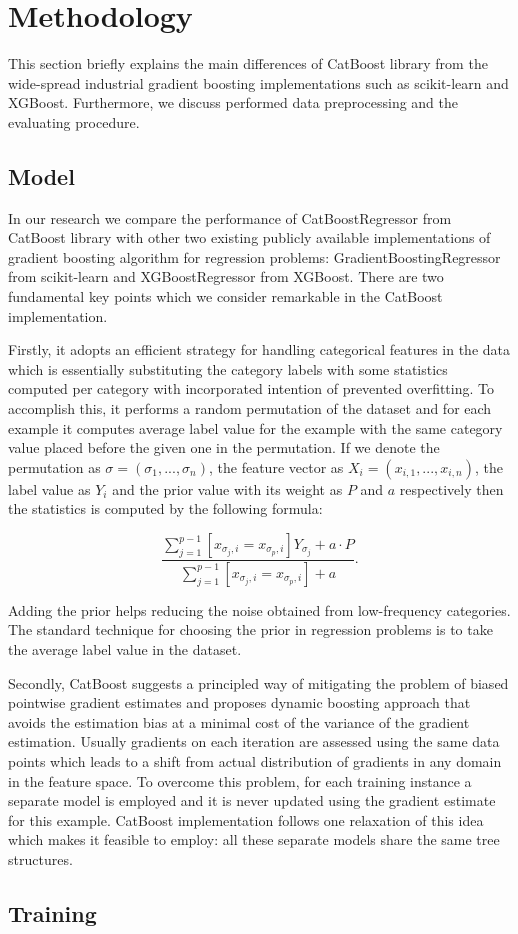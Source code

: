 \section{Methodology}
\label{sec:methodology}

This section briefly explains the main differences of CatBoost library from the wide-spread industrial gradient boosting implementations such as scikit-learn and XGBoost. Furthermore, we discuss performed data preprocessing and the evaluating procedure.

\subsection{Model}

In our research we compare the performance of CatBoostRegressor from CatBoost library with other two existing publicly available implementations of gradient boosting algorithm for regression problems: GradientBoostingRegressor from scikit-learn and XGBoostRegressor from XGBoost. There are two fundamental key points which we consider remarkable in the CatBoost implementation.

Firstly, it adopts an efficient strategy for handling categorical features in the data which is essentially substituting the category labels with some statistics computed per category with incorporated intention of prevented overfitting. To accomplish this, it performs a random permutation of the dataset and for each example it computes average label value for the example with the same category value placed before the given one in the permutation. 
If we denote the permutation as $ \sigma = (\sigma_1, ..., \sigma_n)$, the feature vector as $ X_i = (x_{i, 1}, ..., x_{i, n})$, the label value as $Y_i$ and the prior value with its weight as $P$ and $a$ respectively then the statistics is computed by the following formula:

$$ \frac{\sum_{j=1}^{p-1} [ x_{\sigma_j, i} = x_{\sigma_p, i}] Y_{\sigma_j} + a \cdot P}{\sum_{j=1}^{p-1} [ x_{\sigma_j, i} = x_{\sigma_p, i}] + a }. $$

Adding the prior helps reducing the noise obtained from low-frequency categories. The standard technique for choosing the prior in regression problems is to take the average label value in the dataset.

Secondly, CatBoost suggests a principled way of mitigating the problem of biased pointwise gradient estimates and proposes dynamic boosting approach that avoids the estimation bias at a minimal cost of the variance of the gradient estimation. Usually gradients on each iteration are assessed using the same data points which leads to a shift from actual distribution of gradients in any domain in the feature space. To overcome this problem, for each training instance a separate model is employed and it is never updated using the gradient estimate for this example. CatBoost implementation follows one relaxation of this idea which makes it feasible to employ: all these separate models share the same tree structures.

\subsection{Training}


